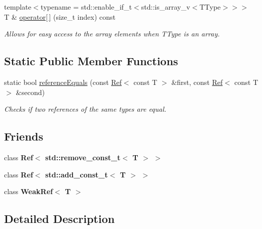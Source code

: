 \begin{DoxyCompactItemize}
{\footnotesize template$<$typename  = std\+::enable\+\_\+if\+\_\+t$<$std\+::is\+\_\+array\+\_\+v$<$\+T\+Type$>$$>$$>$ }\\T \& \mbox{\hyperlink{class_ref_af44580a655b72ebbae930b3056f85277}{operator\mbox{[}$\,$\mbox{]}}} (size\+\_\+t index) const
\begin{DoxyCompactList}\small\item\em Allows for easy access to the array elements when T\+Type is an array. \end{DoxyCompactList}\end{DoxyCompactItemize}
\subsection*{Static Public Member Functions}
\begin{DoxyCompactItemize}
\item 
static bool \mbox{\hyperlink{class_ref_a0dff788348708e8d176d3154d15f4e3a}{reference\+Equals}} (const \mbox{\hyperlink{class_ref}{Ref}}$<$ const T $>$ \&first, const \mbox{\hyperlink{class_ref}{Ref}}$<$ const T $>$ \&second)
\begin{DoxyCompactList}\small\item\em Checks if two references of the same types are equal. \end{DoxyCompactList}\end{DoxyCompactItemize}
\subsection*{Friends}
\begin{DoxyCompactItemize}
\item 
\mbox{\label{class_ref_a872a328b30cc36b030fb5830488fe2e5}} 
class {\bfseries Ref$<$ std\+::remove\+\_\+const\+\_\+t$<$ T $>$ $>$}
\item 
\mbox{\label{class_ref_a643f2206cd45ca251329b8cd0a229661}} 
class {\bfseries Ref$<$ std\+::add\+\_\+const\+\_\+t$<$ T $>$ $>$}
\item 
\mbox{\label{class_ref_a41dafcb9b25b84e93a71f6792a5192bd}} 
class {\bfseries Weak\+Ref$<$ T $>$}
\end{DoxyCompactItemize}


\subsection{Detailed Description}
